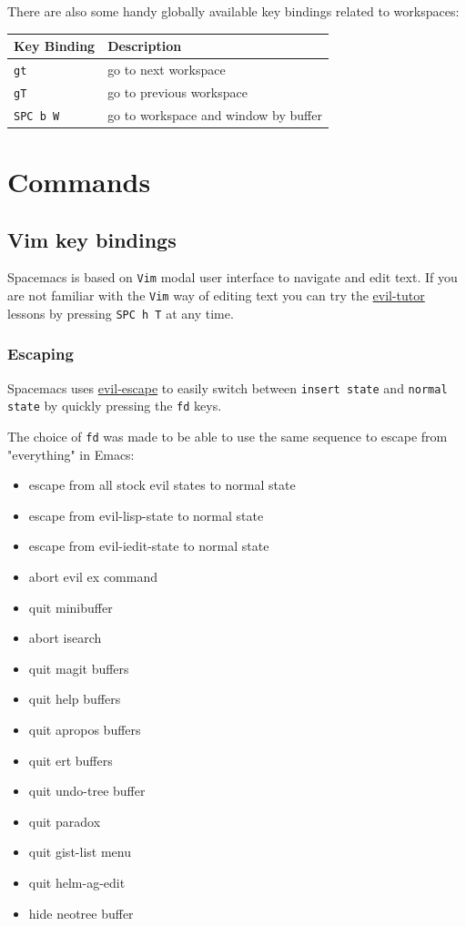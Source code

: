 \documentclass[11pt]{article}
\begin{document}
There are also some handy globally available key bindings related to workspaces:

\begin{center}
\begin{tabular}{ll}
Key Binding & Description\\
\hline
\texttt{gt} & go to next workspace\\
\texttt{gT} & go to previous workspace\\
\texttt{SPC b W} & go to workspace and window by buffer\\
\end{tabular}
\end{center}

\section{Commands}
\label{sec:org06a7411}
\subsection{Vim key bindings}
\label{sec:orgaf2e59f}
Spacemacs is based on \texttt{Vim} modal user interface to navigate and edit text. If
you are not familiar with the \texttt{Vim} way of editing text you can try the
\href{https://github.com/syl20bnr/evil-tutor}{evil-tutor} lessons by pressing \texttt{SPC h T} at any time.

\subsubsection{Escaping}
\label{sec:org0322b3d}
Spacemacs uses \href{https://github.com/syl20bnr/evil-escape}{evil-escape} to
easily switch between \texttt{insert state} and \texttt{normal state} by quickly pressing the
\texttt{fd} keys.

The choice of \texttt{fd} was made to be able to use the same sequence to escape from
"everything" in Emacs:
\begin{itemize}
\item escape from all stock evil states to normal state
\item escape from evil-lisp-state to normal state
\item escape from evil-iedit-state to normal state
\item abort evil ex command
\item quit minibuffer
\item abort isearch
\item quit magit buffers
\item quit help buffers
\item quit apropos buffers
\item quit ert buffers
\item quit undo-tree buffer
\item quit paradox
\item quit gist-list menu
\item quit helm-ag-edit
\item hide neotree buffer
\end{itemize}
\end{document}
